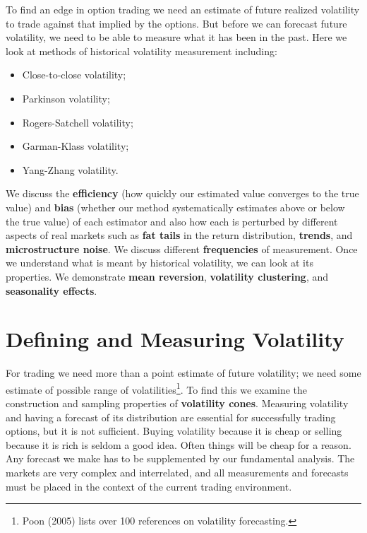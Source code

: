 \documentclass[11pt]{report}
\begin{document}
	To find an edge in option trading we need an estimate of future realized volatility to trade against that implied by the options. But before we can forecast future volatility, we need to be able to measure what it has been in the past. Here we look at methods of historical volatility measurement including:

	\begin{itemize}
		\item Close-to-close volatility;
		\item Parkinson volatility;
		\item Rogers-Satchell volatility;
		\item Garman-Klass volatility;
		\item Yang-Zhang volatility.
	\end{itemize}

	 We discuss the \textbf{efficiency} (how quickly our estimated value converges to the true value) and \textbf{bias} (whether our method systematically estimates above or below the true value) of each estimator and also how each is perturbed by different aspects of real markets such as \textbf{fat tails} in the return distribution, \textbf{trends}, and \textbf{microstructure noise}. We discuss different \textbf{frequencies} of measurement. Once we understand what is meant by historical volatility, we can look at its properties. We demonstrate \textbf{mean reversion}, \textbf{volatility clustering}, and \textbf{seasonality effects}.

	\section{Defining and Measuring Volatility}

		For trading we need more than a point estimate of future volatility; we need some estimate of possible range of volatilities\footnote{Poon (2005) lists over 100 references on volatility forecasting.}. To find this we examine the construction and sampling properties of \textbf{volatility cones}. Measuring volatility and having a forecast of its distribution are essential for successfully trading options, but it is not sufficient. Buying volatility because it is cheap or selling because it is rich is seldom a good idea. Often things will be cheap for a reason. Any forecast we make has to be supplemented by our fundamental analysis. The markets are very complex and interrelated, and all measurements and forecasts must be placed in the context of the current trading environment.
\end{document}
